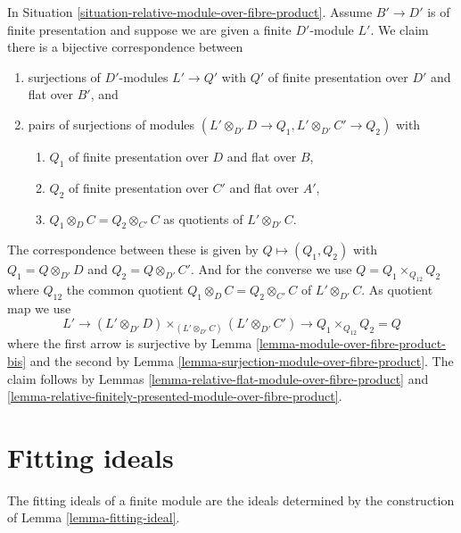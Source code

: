 \begin{remark}
\label{remark-relative-modules-over-fibre-product}
In Situation \ref{situation-relative-module-over-fibre-product}.
Assume $B' \to D'$ is of finite presentation and
suppose we are given a finite $D'$-module $L'$.
We claim there is a bijective correspondence between
\begin{enumerate}
\item surjections of $D'$-modules $L' \to Q'$ with $Q'$ of finite presentation
over $D'$ and flat over $B'$, and
\item pairs of surjections of modules
$(L' \otimes_{D'} D \to Q_1, L' \otimes_{D'} C' \to Q_2)$
with
\begin{enumerate}
\item $Q_1$ of finite presentation over $D$ and flat over $B$,
\item $Q_2$ of finite presentation over $C'$ and flat over $A'$,
\item $Q_1 \otimes_D C = Q_2 \otimes_{C'} C$ as quotients of
$L' \otimes_{D'} C$.
\end{enumerate}
\end{enumerate}
The correspondence between these is given by $Q \mapsto (Q_1, Q_2)$ with
$Q_1 = Q \otimes_{D'} D$ and $Q_2 = Q \otimes_{D'} C'$. And for the converse
we use $Q = Q_1 \times_{Q_{12}} Q_2$ where $Q_{12}$ the common quotient
$Q_1 \otimes_D C = Q_2 \otimes_{C'} C$ of $L' \otimes_{D'} C$. As quotient
map we use
$$
L' \longrightarrow
(L' \otimes_{D'} D) \times_{(L' \otimes_{D'} C)} (L' \otimes_{D'} C')
\longrightarrow Q_1 \times_{Q_{12}} Q_2 = Q
$$
where the first arrow is surjective by
Lemma \ref{lemma-module-over-fibre-product-bis}
and the second by Lemma \ref{lemma-surjection-module-over-fibre-product}.
The claim follows by
Lemmas \ref{lemma-relative-flat-module-over-fibre-product} and
\ref{lemma-relative-finitely-presented-module-over-fibre-product}.
\end{remark}








\section{Fitting ideals}
\label{section-fitting-ideals}

\noindent
The fitting ideals of a finite module are the ideals determined
by the construction of Lemma \ref{lemma-fitting-ideal}.

